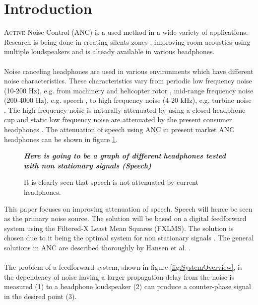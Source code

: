 \section*{Introduction}
\lettrine[lines=2]{A}{ctive} Noise Control (ANC) is a used method in a wide variety of applications. Research is being done in creating silents zones \cite{SilentZones}, improving room acoustics using multiple loudspeakers \cite{CAPS} and is already available in various headphones.
\\\\
Noise canceling headphones are used in various environments which have different noise characteristics. These characteristics vary from periodic low frequency noise (10-200 Hz), e.g. from machinery and helicopter rotor \cite{LowFrequency}, mid-range frequency noise (200-4000 Hz), e.g. speech \cite{MidFrequency}, to high frequency noise (4-20 kHz), e.g. turbine noise \cite{LowFrequency}. The high frequency noise is naturally attenuated by using a closed headphone cup \cite{naturalAttenuation} and static low frequency noise are attenuated by the present consumer headphones \cite{naturalAttenuation}. The attenuation of speech using ANC in present market ANC headphones can be shown in figure \ref{fig:ANCcompare}.

\begin{figure}[H]
	\centering
	\textbf{\textit{Here is going to be a graph of different}}
	\textbf{\textit{ headphones tested with non stationary signals (Speech)}}
	\caption{It is clearly seen that speech is not attenuated by current headphones.}
	\label{fig:ANCcompare}
\end{figure}


This paper focuses on improving attenuation of speech. Speech will hence be seen as the primary noise source. The solution will be based on a digital feedforward system using the Filtered-X Least Mean Squares (FXLMS). The solution is chosen due to it being the optimal system for non stationary signals \cite{Hansen2}. The general solutions in ANC are described thoroughly by Hansen et al. \cite{Hansen}.
\\\\
The problem of a feedforward system, shown in figure \ref{fig:SystemOverview}, is the dependency of noise having a larger propagation delay from the noise is measured (1) to a headphone loudspeaker (2) can produce a counter-phase signal in the desired point (3). 


